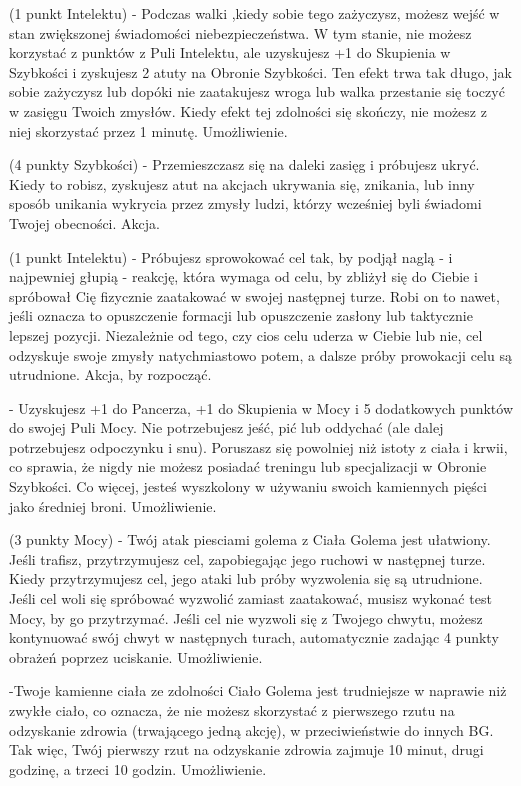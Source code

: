 { (1 punkt Intelektu) - Podczas walki ,kiedy sobie tego zażyczysz, możesz wejść w stan zwiększonej świadomości niebezpieczeństwa. W tym stanie, nie możesz korzystać z punktów z Puli Intelektu, ale uzyskujesz +1 do Skupienia w Szybkości i zyskujesz 2 atuty na Obronie Szybkości. Ten efekt trwa tak długo, jak sobie zażyczysz lub dopóki nie zaatakujesz wroga lub walka przestanie się toczyć w zasięgu Twoich zmysłów. Kiedy efekt tej zdolności się skończy, nie możesz z niej skorzystać przez 1 minutę. Umożliwienie.

 (4 punkty Szybkości) - Przemieszczasz się na daleki zasięg i próbujesz ukryć. Kiedy to robisz, zyskujesz atut na akcjach ukrywania się, znikania, lub  inny sposób unikania wykrycia przez zmysły ludzi, którzy wcześniej byli świadomi Twojej obecności. Akcja.

 (1 punkt Intelektu) - Próbujesz sprowokować cel tak, by podjął naglą - i najpewniej głupią - reakcję, która wymaga od celu, by zbliżył się do Ciebie i spróbował Cię fizycznie zaatakować w swojej następnej turze. Robi on to nawet, jeśli oznacza to opuszczenie formacji lub opuszczenie zasłony lub taktycznie lepszej pozycji. Niezależnie od tego, czy cios celu uderza w Ciebie lub nie, cel odzyskuje swoje zmysły natychmiastowo potem, a dalsze próby prowokacji celu są utrudnione. Akcja, by rozpocząć. 

 - Uzyskujesz +1 do Pancerza, +1 do Skupienia w Mocy i 5 dodatkowych punktów do swojej Puli Mocy. Nie potrzebujesz jeść, pić lub oddychać (ale dalej potrzebujesz odpoczynku i snu). Poruszasz się powolniej niż istoty z ciała i krwii, co sprawia, że nigdy nie możesz posiadać treningu lub specjalizacji w Obronie Szybkości. Co więcej, jesteś wyszkolony w używaniu swoich kamiennych pięści jako średniej broni. Umożliwienie.

 (3 punkty Mocy) - Twój atak piesciami golema z Ciała Golema jest ułatwiony. Jeśli trafisz, przytrzymujesz cel, zapobiegając jego ruchowi w następnej turze. Kiedy przytrzymujesz cel, jego ataki lub próby wyzwolenia się są utrudnione. Jeśli cel woli się spróbować wyzwolić zamiast zaatakować, musisz wykonać test Mocy, by go przytrzymać. Jeśli cel nie wyzwoli się z Twojego chwytu, możesz kontynuować swój chwyt w następnych turach, automatycznie zadając 4 punkty obrażeń poprzez uciskanie. Umożliwienie.

 -Twoje kamienne ciała ze zdolności Ciało Golema jest trudniejsze w naprawie niż zwykłe ciało, co oznacza, że nie możesz skorzystać z pierwszego rzutu na odzyskanie zdrowia (trwającego jedną akcję), w przeciwieństwie do innych BG. Tak więc, Twój pierwszy rzut na odzyskanie zdrowia zajmuje 10 minut, drugi godzinę, a trzeci 10 godzin. Umożliwienie.

}
